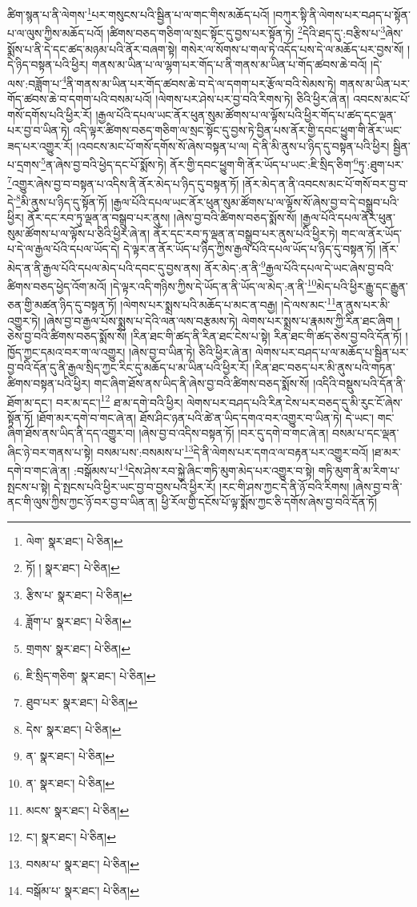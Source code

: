 ཚིག་སྙན་པ་ནི་ལེགས་\footnote{ལེག་  སྣར་ཐང་།  པེ་ཅིན། }པར་གསུངས་པའི་སྦྱིན་པ་ལ་གང་གིས་མཆོད་པའོ། །བཀུར་སྟི་ནི་ལེགས་པར་བཤད་པ་སྟོན་པ་ལ་ལུས་ཀྱིས་མཆོད་པའོ། །ཚིགས་བཅད་གཅིག་ལ་སྲང་སྟོང་དུ་བྱས་པར་སྟོན་ཏེ། \footnote{ཏོ། །   སྣར་ཐང་།  པེ་ཅིན། }དེའི་ཐད་དུ་:བརྩིས་པ་\footnote{རྩིས་པ་  སྣར་ཐང་།  པེ་ཅིན། }ཞེས་སྨོས་པ་ནི་དེ་དང་ཚད་མཉམ་པའི་ནོར་བཞག་སྟེ། གསེར་ལ་སོགས་པ་གལ་ཏེ་འདོད་པས་དེ་ལ་མཆོད་པར་བྱས་སོ། །དེ་ཉིད་བསྟན་པའི་ཕྱིར། གནས་མ་ཡིན་པ་ལ་ལྷག་པར་གོད་པ་ནི་གནས་མ་ཡིན་པ་གོད་ཚབས་ཆེ་བའོ། །དེ་ལས་:བཟློག་པ་\footnote{ཟློག་པ་  སྣར་ཐང་།  པེ་ཅིན། }ནི་གནས་མ་ཡིན་པར་གོད་ཚབས་ཆེ་བ་དེ་ལ་དགག་པར་རྩོལ་བའི་སེམས་ཏེ། གནས་མ་ཡིན་པར་གོད་ཚབས་ཆེ་བ་དགག་པའི་བསམ་པའོ། །ལེགས་པར་ཤེས་པར་བྱ་བའི་རིགས་ཏེ། ཅིའི་ཕྱིར་ཞེ་ན། འབངས་མང་པོ་གསོ་དགོས་པའི་ཕྱིར་རོ། །རྒྱལ་པོའི་དཔལ་ཡང་ནོར་ཕུན་སུམ་ཚོགས་པ་ལ་ལྟོས་པའི་ཕྱིར་གོད་པ་ཚད་དང་ལྡན་པར་བྱ་བ་ཡིན་ཏེ། འདི་ལྟར་ཚིགས་བཅད་གཅིག་ལ་སྲང་སྟོང་དུ་བྱས་ཏེ་བྱིན་པས་ནོར་གྱི་དབང་ཕྱུག་གི་ནོར་ཡང་ཟད་པར་འགྱུར་རོ། །འབངས་མང་པོ་གསོ་དགོས་སོ་ཞེས་བསྟན་པ་ལ། དེ་ནི་མི་ནུས་པ་ཉིད་དུ་བསྟན་པའི་ཕྱིར། སྦྱིན་པ་དྲགས་\footnote{གྲགས་  སྣར་ཐང་།  པེ་ཅིན། }ན་ཞེས་བྱ་བའི་ཕྱེད་དང་པོ་སྨོས་ཏེ། ནོར་གྱི་དབང་ཕྱུག་གི་ནོར་ཡོད་པ་ཡང་:ཇི་སྲིད་ཅིག་\footnote{ཇི་སྲིད་གཅིག་  སྣར་ཐང་།  པེ་ཅིན། }ཏུ་:ཐུག་པར་\footnote{ཐུབ་པར་  སྣར་ཐང་།  པེ་ཅིན། }འགྱུར་ཞེས་བྱ་བ་བསྟན་པ་འདིས་ནི་ནོར་མེད་པ་ཉིད་དུ་བསྟན་ཏོ། །ནོར་མེད་ན་ནི་འབངས་མང་པོ་གསོ་བར་བྱ་བ་དེ་\footnote{དེས་  སྣར་ཐང་།  པེ་ཅིན། }མི་ནུས་པ་ཉིད་དུ་སྟོན་ཏོ། །རྒྱལ་པོའི་དཔལ་ཡང་ནོར་ཕུན་སུམ་ཚོགས་པ་ལ་ལྟོས་སོ་ཞེས་བྱ་བ་དེ་བསྒྲུབ་པའི་ཕྱིར། ནོར་དང་རབ་ཏུ་ལྡན་ན་བསྒྲུབ་པར་ནུས། །ཞེས་བྱ་བའི་ཚིགས་བཅད་སྨོས་སོ། །རྒྱལ་པོའི་དཔལ་ནོར་ཕུན་སུམ་ཚོགས་པ་ལ་ལྟོས་པ་ཅིའི་ཕྱིར་ཞེ་ན། ནོར་དང་རབ་ཏུ་ལྡན་ན་བསྒྲུབ་པར་ནུས་པའི་ཕྱིར་ཏེ། གང་ལ་ནོར་ཡོད་པ་དེ་ལ་རྒྱལ་པོའི་དཔལ་ཡོད་དེ། དེ་ལྟར་ན་ནོར་ཡོད་པ་ཉིད་ཀྱིས་རྒྱལ་པོའི་དཔལ་ཡོད་པ་ཉིད་དུ་བསྟན་ཏོ། །ནོར་མེད་ན་ནི་རྒྱལ་པོའི་དཔལ་མེད་པའི་དབང་དུ་བྱས་ནས། ནོར་མེད་:ན་ནི་\footnote{ན་  སྣར་ཐང་།  པེ་ཅིན། }རྒྱལ་པོའི་དཔལ་དེ་ཡང་ཞེས་བྱ་བའི་ཚིགས་བཅད་ཕྱེད་འོག་མའོ། །དེ་ལྟར་འདི་གཉིས་ཀྱིས་དེ་ཡོད་ན་ནི་ཡོད་ལ་མེད་:ན་ནི་\footnote{ན་  སྣར་ཐང་།  པེ་ཅིན། }མེད་པའི་ཕྱིར་རྒྱུ་དང་རྒྱུན་ཅན་གྱི་མཚན་ཉིད་དུ་བསྟན་ཏོ། །ལེགས་པར་སྨྲས་པའི་མཆོད་པ་མང་ན་བརྒྱ། །དེ་ལས་མང་\footnote{མངས་  སྣར་ཐང་།  པེ་ཅིན། }ན་ནུས་པར་མི་འགྱུར་ཏེ། །ཞེས་བྱ་བ་རྒྱལ་པོས་སྨྲས་པ་དེའི་ལན་ལས་བརྩམས་ཏེ། ལེགས་པར་སྨྲས་པ་རྣམས་ཀྱི་རིན་ཐང་ཞིག །ཅེས་བྱ་བའི་ཚིགས་བཅད་སྨོས་སོ། །རིན་ཐང་གི་ཚད་ནི་རིན་ཐང་ངེས་པ་སྟེ། རིན་ཐང་གི་ཚད་ཅེས་བྱ་བའི་དོན་ཏོ། །ཁྱོད་ཀྱང་དམའ་བར་ག་ལ་འགྱུར། །ཞེས་བྱ་བ་ཡིན་ཏེ། ཅིའི་ཕྱིར་ཞེ་ན། ལེགས་པར་བཤད་པ་ལ་མཆོད་པ་སྦྱིན་པར་བྱ་བའི་དོན་དུ་ནི་རྒྱལ་སྲིད་ཀྱང་རིང་དུ་མཆོད་པ་མ་ཡིན་པའི་ཕྱིར་རོ། །རིན་ཐང་བཅད་པར་མི་ནུས་པའི་གཏན་ཚིགས་བསྟན་པའི་ཕྱིར། གང་ཞིག་ཐོས་ནས་ཡིད་ནི་ཞེས་བྱ་བའི་ཚིགས་བཅད་སྨོས་སོ། །འདིའི་བསྡུས་པའི་དོན་ནི་ཐོག་མ་དང་། བར་མ་དང་།\footnote{ང་།  སྣར་ཐང་།  པེ་ཅིན། } ཐ་མ་དགེ་བའི་ཕྱིར། ལེགས་པར་བཤད་པའི་རིན་ངེས་པར་བཅད་དུ་མི་རུང་ངོ་ཞེས་སྟོན་ཏོ། །ཐོག་མར་དགེ་བ་གང་ཞེ་ན། ཐོས་ཤིང་ཉན་པའི་ཚེ་ན་ཡིད་དགའ་བར་འགྱུར་བ་ཡིན་ཏེ། དེ་ཡང་། གང་ཞིག་ཐོས་ནས་ཡིད་ནི་དད་འགྱུར་བ། །ཞེས་བྱ་བ་འདིས་བསྟན་ཏོ། །བར་དུ་དགེ་བ་གང་ཞེ་ན། བསམ་པ་དང་ལྡན་ཞིང་ཉེ་བར་གནས་པ་སྟེ། བསམ་པས་:བསམས་པ་\footnote{བསམ་པ་  སྣར་ཐང་།  པེ་ཅིན། }དེ་ནི་ལེགས་པར་དགའ་ལ་བརྟན་པར་འགྱུར་བའོ། །ཐ་མར་དགེ་བ་གང་ཞེ་ན། :བསྒོམས་པ་\footnote{བསྒོམ་པ་  སྣར་ཐང་།  པེ་ཅིན། }དེས་ཤེས་རབ་སྐྱེ་ཞིང་གཏི་མུག་མེད་པར་འགྱུར་བ་སྟེ། གཏི་མུག་ནི་མ་རིག་པ་སྤངས་པ་སྟེ། དེ་སྤངས་པའི་ཕྱིར་ཡང་བྱ་བ་བྱས་པའི་ཕྱིར་རོ། །རང་གི་ཤས་ཀྱང་དེ་ནི་ཉོ་བའི་རིགས། །ཞེས་བྱ་བ་ནི་ནང་གི་ལུས་ཀྱིས་ཀྱང་ཉོ་བར་བྱ་བ་ཡིན་ན། ཕྱི་རོལ་གྱི་དངོས་པོ་ལྟ་སྨོས་ཀྱང་ཅི་དགོས་ཞེས་བྱ་བའི་དོན་ཏོ། 